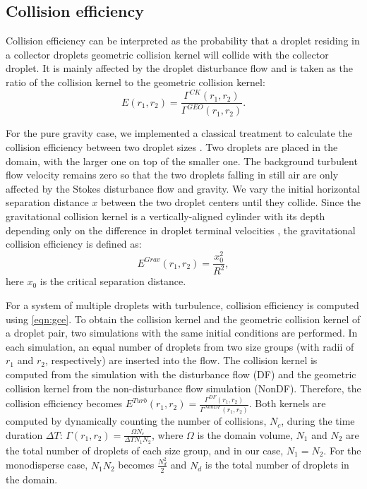 \subsection{Collision efficiency} \label{sec:ch3_CE}
Collision efficiency can be interpreted as the probability that a droplet residing in a collector droplets geometric collision kernel will collide with the collector droplet. It is mainly affected by the droplet disturbance flow and is taken as the ratio of the collision kernel to the geometric collision kernel:
\begin{equation}
\label{eqn:gce}
E(r_1,r_2)=\frac{\Gamma^{CK}(r_1,r_2)}{\Gamma^{GEO}(r_1,r_2)}.
\end{equation}

For the pure gravity case, we implemented a classical treatment to calculate the collision efficiency between two droplet sizes \citep{Rogers1989}. Two droplets are placed in the domain, with the larger one on top of the smaller one. The background turbulent flow velocity remains zero so that the two droplets falling in still air are only affected by the Stokes disturbance flow and gravity. We vary the initial horizontal separation distance $x$ between the two droplet centers until they collide. Since the gravitational collision kernel is a vertically-aligned cylinder with its depth depending only on the difference in droplet terminal velocities \citep{Wang2005a}, the gravitational collision efficiency is defined as:
\begin{equation}
\label{eqn:gce2}
E^{Grav}(r_1,r_2)=\frac{x^2_0}{R^2},
\end{equation}
here $x_0$ is the critical separation distance.

For a system of multiple droplets with turbulence, collision efficiency is computed using \eqref{eqn:gce}. To obtain the collision kernel and the geometric collision kernel of a droplet pair, two simulations with the same initial conditions are performed. In each simulation, an equal number of droplets from two size groups (with radii of $r_1$ and $r_2$, respectively) are inserted into the flow. The collision kernel is computed from the simulation with the disturbance flow (DF) and the geometric collision kernel from the non-disturbance flow simulation (NonDF). Therefore, the collision efficiency becomes $E^{Turb} (r_1,r_2)=\frac{\Gamma^{DF} (r_1,r_2)}{\Gamma^{NonDF} (r_1,r_2)}$. Both kernels are computed by dynamically counting the number of collisions, $N_c$, during the time duration $\Delta T$: $\Gamma(r_1,r_2)=\frac{\Omega N_c}{\Delta TN_1N_2}$, where $\Omega$ is the domain volume, $N_1$ and $N_2$ are the total number of droplets of each size group, and in our case, $N_1 = N_2$. For the monodisperse case, $N_1N_2$ becomes $\frac{N_d^2}{2}$ and $N_d$ is the total number of droplets in the domain. 

